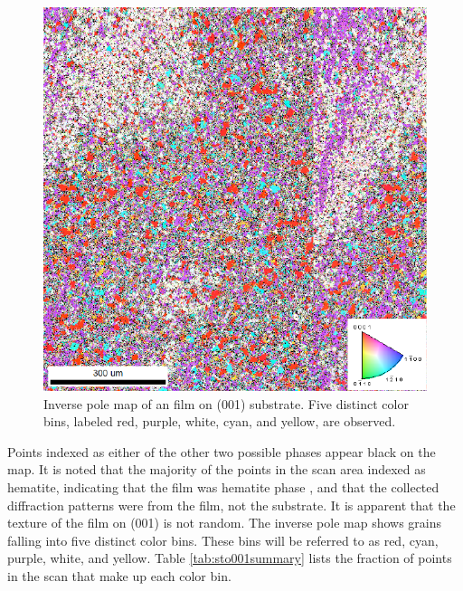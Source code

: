 \begin{figure}
	\includegraphics[width=\textwidth]{001map.pdf}
	\caption[ map of  film on  (001)]{%
		Inverse pole  map of an  film on  (001) 
		substrate. Five distinct color bins, labeled red, purple, white, 
		cyan, and yellow, are observed.}
	\label{fig:001map}
\end{figure}
Points indexed as either of the other two possible phases appear black on the map. It is
noted that the majority of the points in the scan area indexed as hematite, indicating
that the film was hematite phase , and that the collected diffraction patterns
were from the film, not the substrate. It is apparent that the texture of the film on
(001) is not random. The inverse pole map shows grains falling into five
distinct color bins. These bins will be referred to as red, cyan, purple, white, and
yellow. Table \ref{tab:sto001summary} lists the fraction of points in the scan that make
up each color bin. 

